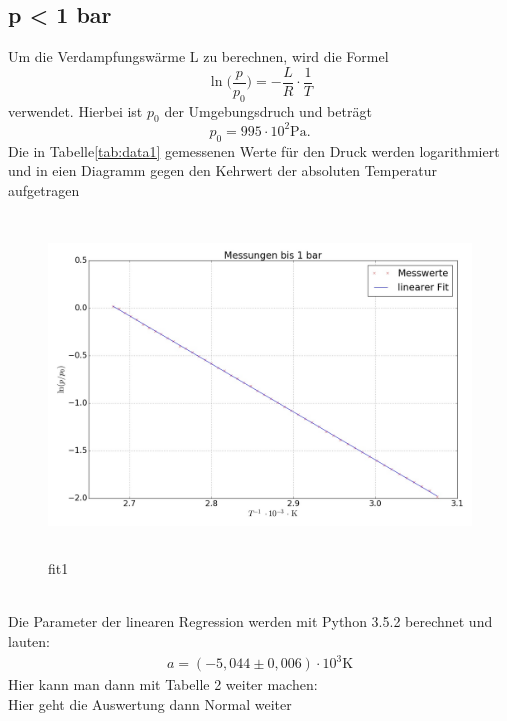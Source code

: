 \subsection{p < 1 bar}
Um die Verdampfungswärme L zu berechnen, wird die Formel
\begin{equation*}
  \ln \bigl(\frac{p}{p_0}\bigr)=-\frac{L}{R} \cdot \frac{1}{T}
\end{equation*}
verwendet. Hierbei ist $p_0$ der Umgebungsdruch und beträgt
\begin{equation*}
  p_0=995\cdot 10^2 \si{\pascal}.
\end{equation*}
Die in Tabelle\ref{tab:data1} gemessenen Werte für den Druck werden logarithmiert und in eien
Diagramm gegen den Kehrwert der absoluten Temperatur aufgetragen \\
 
\begin{figure}
  \centering
  \includegraphics[height=9cm , width=13.5cm]{fit1.jpg}
  \caption{fit1}
  \label{fig:fit1}
  \end{figure}
  \\
Die Parameter der linearen Regression werden mit Python 3.5.2 berechnet und
lauten:
\begin{align*}
  a=(-5,044 \pm 0,006) \cdot 10^3 \si{\kelvin}
\end{align*}
\newpage
Hier kann man dann mit Tabelle 2 weiter machen:
 \\
Hier geht die Auswertung dann Normal weiter
